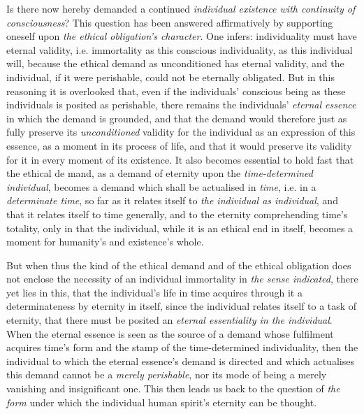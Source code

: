 \documentclass[12pt,a4paper]{book}
\begin{document}
Is there now hereby demanded a continued \emph{individual existence with
continuity of consciousness}? This question has been answered affirmatively by
supporting oneself upon \emph{the ethical obligation's character}. One infers:
individuality must have eternal validity, i.e. immortality as this conscious
individuality, as this individual will, because the ethical demand as
unconditioned has eternal validity, and the individual, if it were perishable,
could not be eternally obligated. But in this reasoning it is overlooked that,
even if the individuals' conscious being as these individuals is posited as
perishable, there remains the individuals' \emph{eternal essence} in which the
demand is grounded, and that the demand would therefore just as fully preserve
its \emph{unconditioned} validity for the individual as an expression of this
essence, as a moment in its process of life, and that it would preserve its
validity for it in every moment of its existence. It also becomes essential to
hold fast that the ethical de\-%
mand, as a demand of eternity upon the \emph{time-determined individual},
becomes a demand which shall be actualised in \emph{time}, i.e. in a
\emph{determinate time}, so far as it relates itself to \emph{the individual as
individual}, and that it relates itself to time generally, and to the eternity
comprehending time's totality, only in that the individual, while it is an
ethical end in itself, becomes a moment for humanity's and existence's whole.

But when thus the kind of the ethical demand and of the ethical obligation does
not enclose the necessity of an individual immortality in \emph{the sense
indicated}, there yet lies in this, that the individual's life in time acquires
through it a determinateness by eternity in itself, since the individual relates
itself to a task of eternity, that there must be posited an \emph{eternal
essentiality in the individual}. When the eternal essence is seen as the source
of a demand whose fulfilment acquires time's form and the stamp of the
time-determined individuality, then the individual to which the eternal
essence's demand is directed and which actualises this demand cannot be a
\emph{merely perishable}, nor its mode of being a merely vanishing and
insignificant one. This then leads us back to the question of \emph{the form}
under which the individual human spirit's eternity can be thought.
\end{document}
